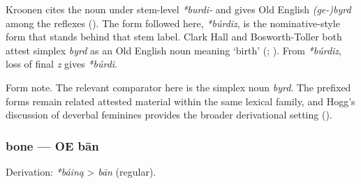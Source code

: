 \documentclass[
  british,
  a4paper,
]{article}
\begin{document}
Kroonen cites the noun under stem-level \emph{*burdi-} and gives Old
English \emph{(ge-)byrd} among the reflexes
(). The form followed here,
\emph{*búrdiz}, is the nominative-style form that stands behind that
stem label. Clark Hall and Bosworth-Toller both attest simplex
\emph{byrd} as an Old English noun meaning `birth'
(;
). From
\emph{*búrdiz}, loss of final \emph{z} gives \emph{*búrdi}.

Form note. The relevant comparator here is the simplex noun \emph{byrd}.
The prefixed forms remain related attested material within the same
lexical family, and Hogg's discussion of deverbal feminines provides the
broader derivational setting ().

\subsubsection{bone --- OE bān}\label{bone-oe-bux101n}

Derivation: \emph{*báiną} \textgreater{} \emph{bān} (regular).

\begingroup
\setlength{\fboxsep}{6pt}
\end{document}
